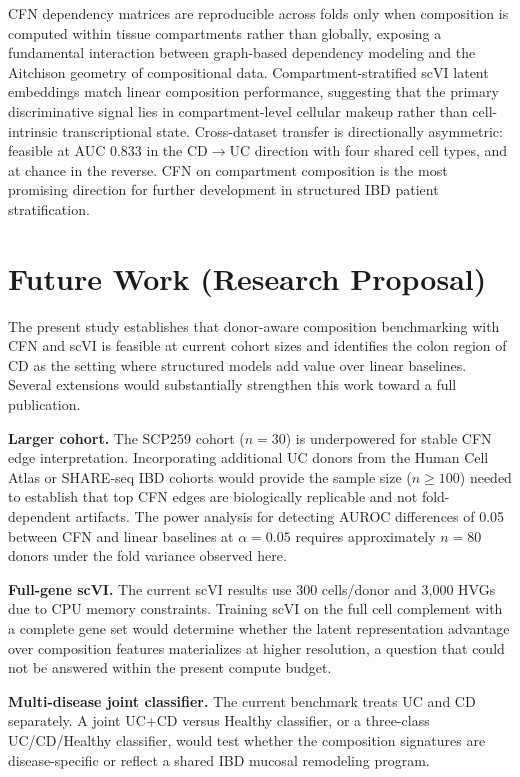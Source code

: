 \documentclass[11pt,letterpaper]{article}
\begin{document}
CFN dependency matrices are reproducible across folds only when composition is
computed within tissue compartments rather than globally, exposing a fundamental
interaction between graph-based dependency modeling and the Aitchison geometry
of compositional data. Compartment-stratified scVI latent embeddings match
linear composition performance, suggesting that the primary discriminative
signal lies in compartment-level cellular makeup rather than cell-intrinsic
transcriptional state. Cross-dataset transfer is directionally asymmetric:
feasible at AUC 0.833 in the CD$\rightarrow$UC direction with four shared cell
types, and at chance in the reverse. CFN on compartment composition is the most
promising direction for further development in structured IBD patient
stratification.

\section{Future Work (Research Proposal)}

The present study establishes that donor-aware composition benchmarking with
CFN and scVI is feasible at current cohort sizes and identifies the colon
region of CD as the setting where structured models add value over linear
baselines. Several extensions would substantially strengthen this work toward
a full publication.

\textbf{Larger cohort.} The SCP259 cohort ($n=30$) is underpowered for stable
CFN edge interpretation. Incorporating additional UC donors from the Human
Cell Atlas or SHARE-seq IBD cohorts would provide the sample size ($n \geq 100$)
needed to establish that top CFN edges are biologically replicable and not
fold-dependent artifacts. The power analysis for detecting AUROC differences of
0.05 between CFN and linear baselines at $\alpha=0.05$ requires approximately
$n=80$ donors under the fold variance observed here.

\textbf{Full-gene scVI.} The current scVI results use 300 cells/donor and
3,000 HVGs due to CPU memory constraints. Training scVI on the full cell
complement with a complete gene set would determine whether the latent
representation advantage over composition features materializes at higher
resolution, a question that could not be answered within the present
compute budget.

\textbf{Multi-disease joint classifier.} The current benchmark treats UC and CD
separately. A joint UC+CD versus Healthy classifier, or a three-class
UC/CD/Healthy classifier, would test whether the composition signatures are
disease-specific or reflect a shared IBD mucosal remodeling program.
\end{document}
